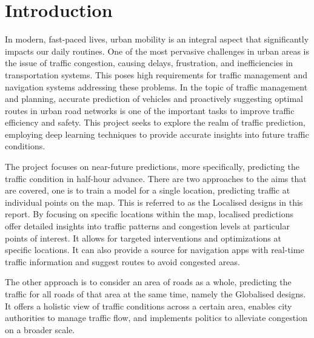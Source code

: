 \chapter{Introduction} \label{Chapter:Introduction}

In modern, fast-paced lives, urban mobility is an integral aspect that significantly impacts our daily routines. 
One of the most pervasive challenges in urban areas is the issue of traffic congestion, causing delays, frustration, and inefficiencies in transportation systems. 
This poses high requirements for traffic management and navigation systems addressing these problems. 
In the topic of traffic management and planning, accurate prediction of vehicles and proactively suggesting optimal routes in urban road networks is one of the important tasks to improve traffic efficiency and safety.
This project seeks to explore the realm of traffic prediction, employing deep learning techniques to provide accurate insights into future traffic conditions. 

The project focuses on near-future predictions, more specifically, predicting the traffic condition in half-hour advance. 
There are two approaches to the aims that are covered, one is to train a model for a single location, predicting traffic at individual points on the map.
This is referred to as the Localised designs in this report. 
By focusing on specific locations within the map, localised predictions offer detailed insights into traffic patterns and congestion levels at particular points of interest. 
It allows for targeted interventions and optimizations at specific locations. It can also provide a source for navigation apps with real-time traffic information and suggest routes to avoid congested areas. 

The other approach is to consider an area of roads as a whole, predicting the traffic for all roads of that area at the same time, namely the Globalised designs. 
It offers a holistic view of traffic conditions across a certain area, enables city authorities to manage traffic flow, and implements politics to alleviate congestion on a broader scale.